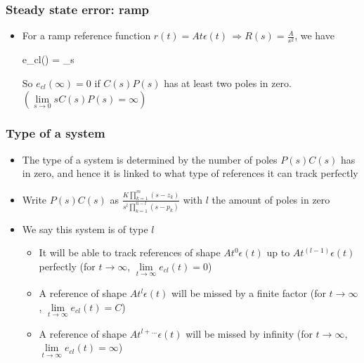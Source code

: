 \begin{frame}
	\frametitle{Steady state error: ramp}
	\begin{itemize}
		\item For a ramp reference function $r(t) = At \epsilon (t) \, \Rightarrow R(s) = \frac{A}{s^2}$, we have
		\begin{flalign*}
			e_{cl}(\infty) = \lim\limits_{s }  
		\end{flalign*}
		So $e_{cl}(\infty) = 0$ if $C(s)P(s)$ has at least two poles in zero. $\left(\lim\limits_{s\rightarrow 0} sC(s)P(s) = \infty\right)$
	\end{itemize}
\end{frame}

\begin{frame}
	\frametitle{Type of a system}
	\begin{itemize}
		\item The type of a system is determined by the number of poles $P(s)C(s)$ has in zero, and hence it is linked to what type of references it can track perfectly
		\item Write $P(s)C(s)$ as $\frac{K \prod_{k=1}^{m} (s-z_k)}{s^l \prod_{k=1}^{n-l} (s-p_k)}$ with $l$ the amount of poles in zero
		\item We say this system is of type $l$
		\begin{itemize}
			\item It will be able to track references of shape $At^0 \epsilon(t)$ up to $At^{(l - 1)} \epsilon(t)$ perfectly (for $t\rightarrow \infty$, $\lim\limits_{t \rightarrow \infty} e_{cl}(t) = 0$)
			\item A reference of shape $At^l \epsilon(t)$ will be missed by a finite factor (for $t\rightarrow \infty$, $\lim\limits_{t \rightarrow \infty} e_{cl}(t) = C$)
			\item A reference of shape $At^{l+...} \epsilon(t)$ will be missed by infinity (for $t\rightarrow \infty$, $\lim\limits_{t \rightarrow \infty} e_{cl}(t) = \infty$)
		\end{itemize}
	\end{itemize}
\end{frame}

